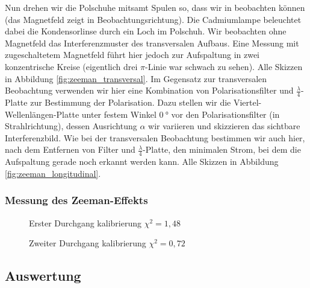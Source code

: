 \documentclass[11pt, a4paper]{article}
\begin{document}
Nun drehen wir die Polschuhe mitsamt Spulen so, dass wir in  beobachten können (das Magnetfeld zeigt in Beobachtungsrichtung).
Die Cadmiumlampe beleuchtet dabei die Kondensorlinse durch ein Loch im Polschuh.
Wir beobachten ohne Magnetfeld das Interferenzmuster des transversalen Aufbaus.
Eine Messung mit zugeschaltetem Magnetfeld führt hier jedoch zur Aufspaltung in zwei konzentrische Kreise (eigentlich drei $\pi$-Linie war schwach zu sehen).
Alle Skizzen in Abbildung \ref{fig:zeeman_transversal}.
Im Gegensatz zur transversalen Beobachtung verwenden wir hier eine Kombination von Polarisationsfilter und $\frac{\lambda}{4}$-Platte zur Bestimmung der Polarisation.
Dazu stellen wir die Viertel-Wellenlängen-Platte unter festem Winkel $\SI{0}{\degree}$ vor den Polarisationsfilter (in Strahlrichtung), dessen Ausrichtung $\alpha$ wir variieren und skizzieren das sichtbare Interferenzbild.
Wie bei der transversalen Beobachtung bestimmen wir auch hier, nach dem Entfernen von Filter und $\frac{\lambda}{4}$-Platte, den minimalen Strom, bei dem die Aufspaltung gerade noch erkannt werden kann.
Alle Skizzen in Abbildung \ref{fig:zeeman_longitudinal}.

\subsubsection{Messung des Zeeman-Effekts}

\begin{figure}[h]
\centering

\caption{Erster Durchgang kalibrierung $\chi^2=1,48$}
\label{fig:kalibrierung1}
\end{figure}
\begin{figure}[h]
\centering

\caption{Zweiter Durchgang kalibrierung $\chi^2=0,72$}
\label{fig:kalibrierung2}
\end{figure}

\FloatBarrier

\subsection{Auswertung}
\end{document}
